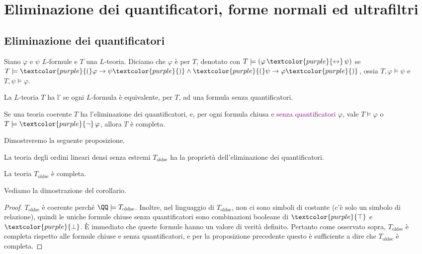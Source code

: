 \section{Eliminazione dei quantificatori, forme normali ed ultrafiltri}
\subsection{Eliminazione dei quantificatori}
\begin{definition}
    Siano $\varphi$ e $\psi$ $L$-formule e $T$ una $L$-teoria. Diciamo che $\varphi$ è  per $T$,
    denotato con $T \models (\varphi \,\textcolor{purple}{\leftrightarrow}\, \psi)$ se $T \models \textcolor{purple}{(} \varphi \rightarrow \psi \textcolor{purple}{)} \land \textcolor{purple}{(} \psi \rightarrow \varphi \textcolor{purple}{)}$,
    ossia $T,\varphi \models \psi$ e $T,\psi \models \varphi$.
\end{definition}

\begin{definition}
    La $L$-teoria $T$ ha l' se ogni $L$-formula è equivalente, per $T$,
    ad una formula senza quantificatori.
\end{definition}

Se una teoria coerente $T$ ha l'eliminazione dei quantificatori, e, per ogni formula chiusa \textcolor{purple}{e senza quantificatori} $\varphi$, 
vale $T \models \varphi$ o $T \models \textcolor{purple}{\neg} \,\varphi$, allora $T$ è completa.

Dimostreremo la seguente proposizione.

\begin{proposition}
    La teoria degli ordini lineari densi senza estremi $T_{\text{oldse}}$ ha la proprietà dell'eliminazione dei quantificatori.
\end{proposition}

\begin{corollary}
    La teoria $T_{\text{oldse}}$ è completa.
\end{corollary}

Vediamo la dimostrazione del corollario.

\begin{proof}
    $T_{\text{oldse}}$ è coerente perché $\QQ \models T_{\text{oldse}}$. Inoltre, nel linguaggio di $T_{\text{oldse}}$,
    non ci sono simboli di costante (c'è solo un simbolo di relazione), quindi le uniche formule chiuse senza quantificatori sono 
    combinazioni booleane di $\textcolor{purple}{\top}$ e $\textcolor{purple}{\bot}$. È immediato che queste formule
    hanno un valore di verità definito. Pertanto come osservato sopra, $T_{\text{oldse}}$ è completa rispetto alle formule chiuse e senza quantificatori, e per la proposizione precedente questo è sufficiente a dire che $T_{\text{oldse}}$ è completa.
\end{proof}

